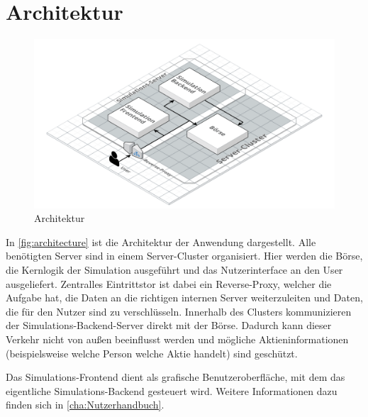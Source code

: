 \section{Architektur}\label{sec:Architektur}
\begin{figure}[ht]
    \includegraphics[width=\textwidth]{img/architecture.png}
    \centering
    \caption{Architektur}
    \label{fig:architecture}
\end{figure}

In \autoref{fig:architecture} ist die Architektur der Anwendung dargestellt.
Alle benötigten Server sind in einem Server-Cluster organisiert.
Hier werden die Börse, die Kernlogik der Simulation ausgeführt und das Nutzerinterface an den User ausgeliefert. Zentralles Eintrittstor ist dabei ein Reverse-Proxy, welcher die Aufgabe hat, die Daten an die richtigen internen Server weiterzuleiten und Daten, die für den Nutzer sind zu verschlüsseln.
Innerhalb des Clusters kommunizieren der Simulations-Backend-Server direkt mit der Börse. Dadurch kann dieser Verkehr nicht von außen beeinflusst werden und mögliche Aktieninformationen (beispielsweise welche Person welche Aktie handelt) sind geschützt.

Das Simulations-Frontend dient als grafische Benutzeroberfläche, mit dem das eigentliche Simulations-Backend gesteuert wird. Weitere Informationen dazu finden sich in \autoref{cha:Nutzerhandbuch}.

